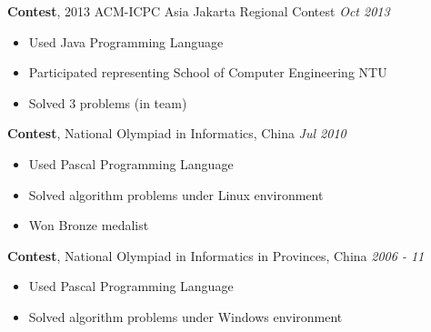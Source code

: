 \documentclass[a4paper, 12pt]{article}
\newenvironment{changemargin}[2]{%
  \begin{list}{}{%
      \setlength{\topsep}{0pt}%
      \setlength{\leftmargin}{#1}%
      \setlength{\rightmargin}{#2}%
      \setlength{\listparindent}{\parindent}%
      \setlength{\itemindent}{\parindent}%
      \setlength{\parsep}{\parskip}%
    }%
  \item[]}{\end{list}
}
\newenvironment{body}
{
\vspace*{-16pt}
\begin{changemargin}{-0.25in}{-0.5in}
}	
{
\end{changemargin}
}
\begin{document}
\begin{body}
  \textbf{Contest}, {2013 ACM-ICPC Asia Jakarta Regional Contest} \hfill \emph{Oct 2013}\\
  \vspace*{-4pt}
  \begin{itemize} \itemsep -0pt  \small
  \item Used Java Programming Language
  \item Participated representing School of Computer Engineering NTU
  \item Solved 3 problems (in team)
  \end{itemize}
  
  \textbf {Contest}, {National Olympiad in Informatics, China} \hfill \emph{Jul 2010}\\
  \vspace*{-4pt}
  \begin{itemize} \itemsep -0pt \small
  \item Used Pascal Programming Language
  \item Solved algorithm problems under Linux environment
  \item Won Bronze medalist
  \end{itemize}

  \textbf {Contest}, {National Olympiad in Informatics in Provinces, China} \hfill \emph{2006 - 11}\\
  \vspace*{-4pt}
  \begin{itemize} \itemsep -0pt \small
  \item Used Pascal Programming Language
  \item Solved algorithm problems under Windows environment
  \end{itemize}
\end{body}
\end{document}
